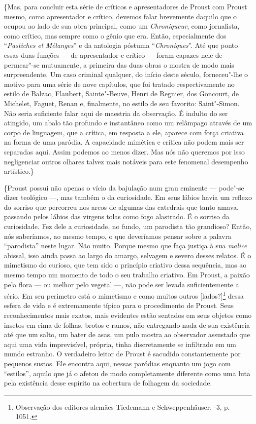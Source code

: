\{Mas, para concluir esta série de críticos e apresentadores de Proust
com Proust mesmo, como apresentador e crítico, devemos falar brevemente
daquilo que o ocupou ao lado de sua obra principal, como um
\emph{Chroniqueur}, como jornalista, como crítico, mas sempre como o
gênio que era. Então, especialmente dos ``\emph{Pastiches et Mélanges}'' e
da antologia póstuma ``\emph{Chroniques}''. Até que ponto essas duas
funções --- de apresentador e crítico --- foram capazes nele de permear"-se
mutuamente, a primeira das duas obras o mostra de modo mais
surpreendente. Um caso criminal qualquer, do início deste século,
forneceu"-lhe o motivo para uma série de nove capítulos, que foi
tratado respectivamente no estilo de Balzac, Flaubert, Sainte"-Beuve,
Henri de Regnier, dos Goncourt, de Michelet, Faguet, Renan e,
finalmente, no estilo de seu favorito: Saint"-Simon. Não seria suficiente
falar aqui de maestria da observação. É indulto do ser atingido, um
abalo tão profundo e instantâneo como um relâmpago através de um corpo
de linguagem, que a crítica, em resposta a ele, aparece com força
criativa na forma de uma paródia. A capacidade mimética e crítica não
podem mais ser separadas aqui. Assim podemos ao menos dizer. Mas nós não
queremos por isso negligenciar outros olhares talvez mais notáveis para
este fenomenal desempenho artístico.\}

\{Proust possui não apenas o vício da bajulação num grau eminente ---
pode"-se dizer teológico ---, mas também o da curiosidade. Em seus lábios
havia um reflexo do sorriso que percorreu nos arcos de algumas das
catedrais que tanto amava, passando pelos lábios das virgens tolas como
fogo alastrado. É o sorriso da curiosidade. Fez dele a curiosidade, no
fundo, um parodista tão grandioso? Então, nós saberíamos, ao mesmo
tempo, o que deveríamos pensar sobre a palavra ``parodista'' neste lugar.
Não muito. Porque mesmo que faça justiça à sua \emph{malice} abissal,
isso ainda passa ao largo do amargo, selvagem e severo desses relatos. É
o mimetismo do curioso, que tem sido o princípio criativo dessa
sequência, mas ao mesmo tempo um momento de todo o seu trabalho
criativo. Em Proust, a paixão pela flora --- ou melhor pelo vegetal ---,
não pode ser levada suficientemente a sério. Em seu perímetro está o
mimetismo e como muitos outros {[}lados?{]}\footnote{Observação dos
  editores alemães Tiedemann e Schweppenhäuser, -3,
  p. 1051. \versal{[N. E.]}} dessa esfera de vida e é extremamente típico para o
procedimento de Proust. Seus reconhecimentos mais exatos, mais evidentes
estão sentados em seus objetos como insetos em cima de folhas, brotos e
ramos, não entregando nada de sua existência até que um salto, um bater
de asas, um pulo mostra ao observador assustado que aqui uma vida
imprevisível, própria, tinha discretamente se infiltrado em um mundo
estranho. O verdadeiro leitor de Proust é sacudido constantemente por
pequenos sustos. Ele encontra aqui, nessas paródias enquanto um jogo com
``estilos'', aquilo que já o afetou de modo completamente diferente como
uma luta pela existência desse espírito na cobertura de folhagem da
sociedade.

